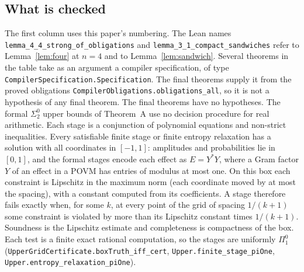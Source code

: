 \subsection{What is checked}
The first column uses this paper's numbering. The Lean names
\nolinkurl{lemma_4_4_strong_of_obligations} and
\nolinkurl{lemma_3_1_compact_sandwiches} refer to Lemma~\ref{lem:four} at
$n=4$ and to Lemma~\ref{lem:sandwich}. Several theorems in the table take
as an argument a compiler specification, of type
\nolinkurl{CompilerSpecification.Specification}. The final theorems supply
it from the proved obligations \nolinkurl{CompilerObligations.obligations_all},
so it is not a hypothesis of any final theorem. The final theorems have no hypotheses.
The formal $\Sigma^0_2$ upper bounds of Theorem~A use no decision procedure for real arithmetic.
Each stage is a conjunction of polynomial equations and non-strict inequalities. Every satisfiable finite stage or finite entropy relaxation has a
solution with all coordinates in $[-1,1]$: amplitudes and probabilities lie
in $[0,1]$, and the formal stages encode each effect as $E=Y^*Y$, where a Gram factor $Y$ of an effect in a POVM has entries of modulus
at most one. On this box each constraint is Lipschitz in the maximum norm (each coordinate moved by at most the spacing), with a constant
computed from its coefficients. A stage therefore fails exactly when, for
some $k$, at every point of the grid of spacing $1/(k+1)$ some constraint is
violated by more than its Lipschitz constant times $1/(k+1)$. Soundness is
the Lipschitz estimate and completeness is compactness of the box. Each
test is a finite exact rational computation, so the stages are uniformly
$\Pi^0_1$ (\nolinkurl{UpperGridCertificate.boxTruth_iff_cert},
\nolinkurl{Upper.finite_stage_piOne}, \nolinkurl{Upper.entropy_relaxation_piOne}).

